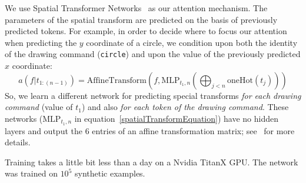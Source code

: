 \documentclass{article}
\begin{document}
We use Spatial Transformer Networks~\cite{jaderberg2015spatial}
as our attention mechanism.
The parameters of the spatial transform are predicted on the basis of previously predicted tokens.
For example, in order to decide where to focus our attention when predicting the $y$ coordinate of a circle,
we condition upon both the identity of the drawing command (\verb|circle|) and upon the value of the previously predicted $x$ coordinate:
\begin{equation}
  a(f|t_{1:(n - 1)}) = \text{AffineTransform}(f, \text{MLP}_{t_1,n}(\bigoplus_{j < n}\text{oneHot}(t_j)))
  \label{spatialTransformEquation}
\end{equation}
So, we learn a different network for predicting special transforms
\emph{for each drawing command} (value of $t_1$) and also \emph{for each token of the drawing command}.
These networks ($\text{MLP}_{t_1,n}$ in equation~\ref{spatialTransformEquation}) have no hidden layers and
output the 6 entries of an affine transformation matrix; see~\cite{jaderberg2015spatial}
for more details.

Training takes a little bit less than a day on a Nvidia TitanX GPU.
The network was trained on $10^5$ synthetic examples.
\end{document}
